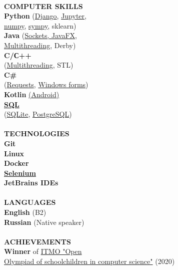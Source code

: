 \documentclass{article}
\begin{document}
\begin{vwcol}[widths={0.8,0.2},
 sep=.8cm, justify=flush,rule=0pt,indent=1em]
\\
\noindent\textcolor[rgb]{0.1255,0.2902,0.7843}{\textbf{COMPUTER SKILLS}}\\
\textbf{Python} (\href{https://github.com/igoose1/wikirace}{Django}, \href{https://github.com/NikPeg/synchronization-of-neuromorphic-networks-of-the-close-world-from-the-point-of-view-of-complexes}{Jupyter},\\
\href{https://github.com/NikPeg/Reinforcement-learning-for-resource-allocation-tasks-in-the-cloud}{numpy}, \href{https://github.com/NikPeg/Calculus_and_Algebra_sympy}{sympy}, sklearn)\\
\textbf{Java} (\href{https://github.com/NikPeg/jigsaw_sockets_and_saving}{Sockets, JavaFX,}\\
\href{https://github.com/NikPeg/StudentsBooks}{Multithreading}, Derby)\\
\textbf{C/С++}\\
(\href{https://github.com/NikPeg/OS_multithreaded_tasks}{Multithreading}, STL)\\
\textbf{C\#}\\
(\href{https://gitlab.com/peganov.nik/messengerapi}{Requests}, \href{https://gitlab.com/peganov.nik/diveintofractal}{Windows forms})\\
\textbf{Kotlin} \href{https://gitlab.com/peganov.nik/smartlearning}{(Android)}\\
\textbf{\href{https://github.com/NikPeg/CoffeePult}{SQL}}\\
(\href{https://github.com/NikPeg/ExtraterrestrialBot}{SQLite}, \href{https://github.com/NikPeg/CoffeePult}{PostgreSQL})\\
\\
\noindent\textcolor[rgb]{0.1255,0.2902,0.7843}{\textbf{TECHNOLOGIES}}\\
\textbf{
Git\\
Linux\\
Docker\\
\href{https://github.com/NikPeg/csbot}{Selenium}\\
JetBrains IDEs\\
}
\\
\noindent\textcolor[rgb]{0.1255,0.2902,0.7843}{\textbf{LANGUAGES}}\\
\textbf{English} (B2)\\
\textbf{Russian} (Native speaker)\\
\\
\noindent\textcolor[rgb]{0.1255,0.2902,0.7843}{\textbf{ACHIEVEMENTS}}\\
\textbf{Winner} of \href{https://olymp.itmo.ru/}{ITMO "Open\\ Olympiad of schoolchildren in computer science"} (2020)\\

\end{vwcol}
\end{document}

